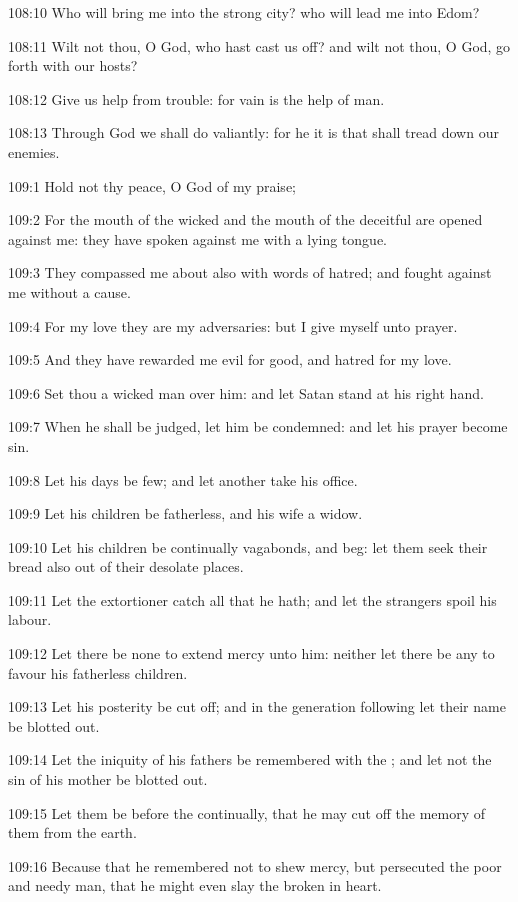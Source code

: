 108:10 Who will bring me into the strong city? who will lead me into Edom?

108:11 Wilt not thou, O God, who hast cast us off? and wilt not thou, O God, go forth with our hosts?

108:12 Give us help from trouble: for vain is the help of man.

108:13 Through God we shall do valiantly: for he it is that shall tread down our enemies.



109:1 Hold not thy peace, O God of my praise;

109:2 For the mouth of the wicked and the mouth of the deceitful are opened against me: they have spoken against me with a lying tongue.

109:3 They compassed me about also with words of hatred; and fought against me without a cause.

109:4 For my love they are my adversaries: but I give myself unto prayer.

109:5 And they have rewarded me evil for good, and hatred for my love.

109:6 Set thou a wicked man over him: and let Satan stand at his right hand.

109:7 When he shall be judged, let him be condemned: and let his prayer become sin.

109:8 Let his days be few; and let another take his office.

109:9 Let his children be fatherless, and his wife a widow.

109:10 Let his children be continually vagabonds, and beg: let them seek their bread also out of their desolate places.

109:11 Let the extortioner catch all that he hath; and let the strangers spoil his labour.

109:12 Let there be none to extend mercy unto him: neither let there be any to favour his fatherless children.

109:13 Let his posterity be cut off; and in the generation following let their name be blotted out.

109:14 Let the iniquity of his fathers be remembered with the \LORD; and let not the sin of his mother be blotted out.

109:15 Let them be before the \LORD continually, that he may cut off the memory of them from the earth.

109:16 Because that he remembered not to shew mercy, but persecuted the poor and needy man, that he might even slay the broken in heart.

